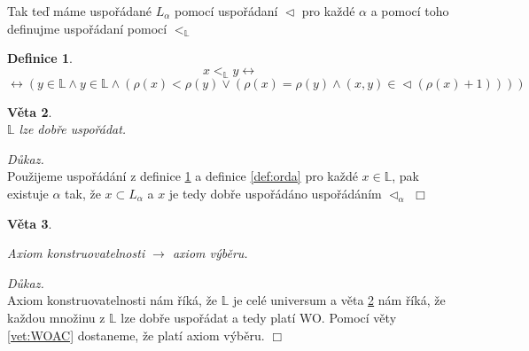 \documentclass[12pt,a4paper]{article}
\newtheorem{veta}{V\v{e}ta}[section]%
\newtheorem{definice}[veta]{Definice}
\newenvironment{proof}
{\noindent \textit{D\r{u}kaz.}}
{\hspace*{\fill} $\Box$}
\begin{document}
Tak te\v{d} m\'{a}me uspo\v{r}\'{a}dan\'{e} $ L_\alpha $ pomoc\'{i} uspo\v{r}\'{a}dan\'{i}  $ \vartriangleleft  $ pro ka\v{z}d\'{e} $ \alpha $ a pomoc\'{i} toho definujme uspo\v{r}\'{a}dan\'{i} pomoc\'{i} $ <_\mathbb{L} $
\begin{definice}
\[ x <_\mathbb{L} y \leftrightarrow  \] \[ \leftrightarrow ( y \in \mathbb{L} \wedge y \in \mathbb{L} \wedge (\rho(x)< \rho(y) \vee (\rho(x)=\rho(y) \wedge (x,y) \in \vartriangleleft(\rho(x)+1)))) \]
\label{def:ord}
\end{definice}
\newpage
\begin{veta}~\\
$ \mathbb{L} $ lze dob\v{r}e uspo\v{r}\'{a}dat.
\label{vet:ordering}
\end{veta}
\begin{proof}~\\
Pou\v{z}ijeme uspo\v{r}\'{a}d\'{a}n\'{i} z definice \ref{def:ord} a definice \ref{def:orda} pro ka\v{z}d\'{e} $ x \in \mathbb{L} $, pak existuje $  \alpha  $ tak, \v{z}e $ x \subset L_\alpha $ a $ x $ je tedy dob\v{r}e uspo\v{r}\'{a}d\'{a}no uspo\v{r}\'{a}d\'{a}n\'{i}m  $ \vartriangleleft_\alpha $
\end{proof}
\begin{veta}~
\label{vet:AC}
\begin{center}
Axiom konstruovatelnosti $ \rightarrow $ axiom v\'{y}b\v{e}ru.
\end{center}
\end{veta}
\begin{proof}~\\
Axiom konstruovatelnosti n\'{a}m \v{r}\'{i}k\'{a}, \v{z}e $ \mathbb{L} $ je cel\'{e} universum a v\v{e}ta \ref{vet:ordering} n\'{a}m \v{r}\'{i}k\'{a}, \v{z}e ka\v{z}dou mno\v{z}inu z $ \mathbb{L} $ lze dob\v{r}e uspo\v{r}\'{a}dat a tedy plat\'{i} WO. Pomoc\'{i} v\v{e}ty \ref{vet:WOAC} dostaneme, \v{z}e plat\'{i} axiom v\'{y}b\v{e}ru.
\end{proof}
\newpage
\end{document}
